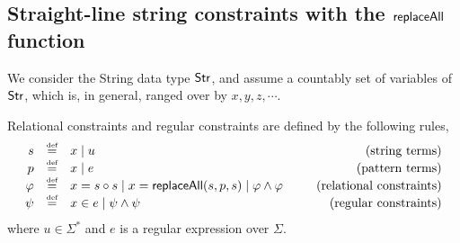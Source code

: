 
\subsection{Straight-line string constraints with the $\mathsf{replaceAll}$ function}


We consider the String data type ${\sf Str}$, and assume a countably set of variables of ${\sf Str}$, which is, in general, ranged over by $x, y, z, \cdots$.  




\begin{definition}
	Relational constraints and regular constraints are defined by the following rules,
	\[
	\begin{array}{r c l cr}
	s &\eqdef & x \mid u & \ \ & \mbox{(string terms)}\\
	p &\eqdef & x \mid e & \ \ & \mbox{(pattern terms)}\\
	\varphi &\eqdef & x = s \concat s  \mid  x = \replaceall(s, p, s) \mid \varphi \wedge \varphi & \ \ & \mbox{(relational constraints)}\\
	\psi & \eqdef & x \in e \mid \psi \wedge \psi %
	& \ \ & \mbox{(regular constraints)} \\
	\end{array}
	\]
	where $u \in \Sigma^\ast$ and $e$ is a regular expression over $\Sigma$. 
	
%	
\end{definition}



